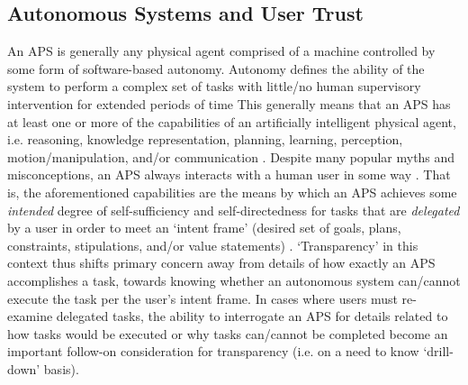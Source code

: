 \subsection{Autonomous Systems and User Trust}
An APS is generally any physical agent comprised of a machine controlled by some form of software-based autonomy. Autonomy defines the ability of the system to perform a complex set of tasks with little/no human supervisory intervention for extended periods of time  This generally means that an APS has at least one or more of the capabilities of an artificially intelligent physical agent, i.e. reasoning, knowledge representation, planning, learning, perception, motion/manipulation, and/or communication \cite{Israelsen2017-ym}. 
Despite many popular myths and misconceptions, an APS always interacts with a human user in some way \cite{Bradshaw2013-ck}. 
That is, the aforementioned capabilities are the means by which an APS achieves some \emph{intended} degree of self-sufficiency and self-directedness for tasks that are \emph{delegated} by a user in order to meet an `intent frame' (desired set of goals, plans, constraints, stipulations, and/or value statements) \cite{Miller2014-av}. `Transparency' in this context thus shifts primary concern away from details of how exactly an APS accomplishes a task, towards knowing whether an autonomous system can/cannot execute the task per the user's intent frame. 
In cases where users must re-examine delegated tasks, the ability to interrogate an APS for details related to how tasks would be executed or why tasks can/cannot be completed become an important follow-on consideration for transparency (i.e. on a need to know `drill-down' basis). 

